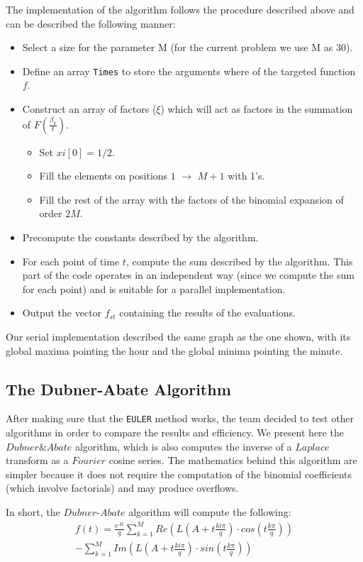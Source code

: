 The implementation of the algorithm follows the procedure described above and can be described the following manner:
\begin{itemize}
\item{Select a size for the parameter M (for the current problem we use M as 30).}
\item{Define an array \texttt{Times} to store the arguments where of the targeted function $f$.}
\item{Construct an array of factors ($\xi$) which will act as factors in the summation of $F(\frac{\beta_k}{t})$.

	\begin{itemize}
	\item Set $xi[0] = 1/2$.
	\item Fill the elements on positions $1$ $\to$ $M+1$ with 1's.
	\item Fill the rest of the array with the factors of the binomial expansion of order $2M$.
	\end{itemize}
}
\item{Precompute the constants described by the algorithm.}
\item{For each point of time $t$, compute the sum described by the algorithm. This part of the code operates in an independent way (since we compute the sum for each point) and is suitable for a parallel implementation.}
\item{Output the vector $f_{st}$ containing the results of the evaluations.}
\end{itemize} 

Our serial implementation described the same graph as the one shown, with its global maxima pointing the hour and the global minima pointing the minute.


\subsection{The Dubner-Abate Algorithm}
After making sure that the \texttt{EULER} method works, the team decided to test other algorithms in order to compare the results and efficiency.
We present here the $Dubner \& Abate$ algorithm, which is also computes the inverse of a $Laplace$ transform as a $Fourier$ cosine series.
The mathematics behind this algorithm are simpler because it does not require the computation of the binomial coefficients (which involve factorials) and may produce overflows.

In short, the $Dubner$-$Abate$ algorithm will compute the following:
\begin{align*}
f(t) = \frac{e^{At}}{q} \sum\limits_{k=1}^{M}{Re(L(A+t\frac{ki\pi}{q}) \cdot cos(t\frac{k\pi}{q}))} \\
- \sum\limits_{k=1}^{M}{Im(L(A+t\frac{ki\pi}{q}) \cdot sin(t\frac{k\pi}{q}) )}
\end{align*}
\newline

